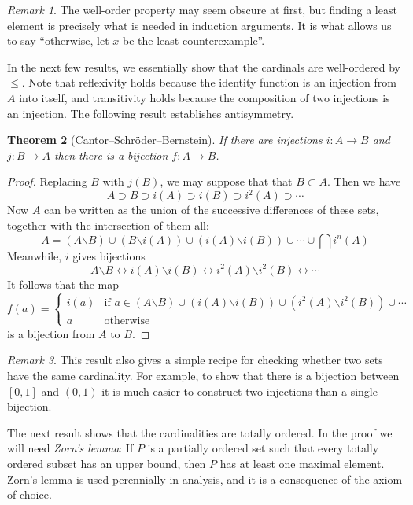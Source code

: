 \documentclass[11pt,oneside]{amsbook}
\theoremstyle{definition}
\theoremstyle{plain}
\newtheorem{thm}{Theorem}[section]
\theoremstyle{definition}
\theoremstyle{remark}
\newtheorem{rem}[thm]{Remark}
\begin{document}
\begin{rem}
  The well-order property may seem obscure at first, but finding a least element is precisely what is needed in induction arguments. It is what allows us to say ``otherwise, let $x$ be the least counterexample''.
\end{rem}

In the next few results, we essentially show that the cardinals are well-ordered by $\leq$. Note that reflexivity holds because the identity function is an injection from $A$ into itself, and transitivity holds because the composition of two injections is an injection. The following result establishes antisymmetry.

\begin{thm}[Cantor--Schr\"oder--Bernstein]
  \label{thm:csb}
  If there are injections $i\colon A\to B$ and $j\colon B\to A$ then there is a bijection $f\colon A\to B$.
\end{thm}

\begin{proof}
  Replacing $B$ with $j(B)$, we may suppose that that $B\subset A$. Then we have
  \[A\supset B\supset i(A)\supset i(B)\supset i^2(A)\supset\cdots
  \]
  Now $A$ can be written as the union of the successive differences of these sets, together with the intersection of them all:
  \[A=(A\mathord{\smallsetminus}B)\cup(B\mathord{\smallsetminus}i(A))
  \cup(i(A)\mathord{\smallsetminus}i(B))\cup\cdots\cup \bigcap i^n(A)
  \]
  Meanwhile, $i$ gives bijections
  \[A\mathord{\smallsetminus}B\leftrightarrow i(A)\mathord{\smallsetminus}i(B)\leftrightarrow i^2(A)\mathord{\smallsetminus}i^2(B)\leftrightarrow\cdots
  \]
  It follows that the map
  \[f(a)=\begin{cases}i(a)&\text{if }a\in(A\mathord{\smallsetminus}B)\cup(i(A)\mathord{\smallsetminus}i(B))\cup(i^2(A)\mathord{\smallsetminus}i^2(B))\cup\cdots\\
    a&\text{otherwise}
  \end{cases}
  \]
  is a bijection from $A$ to $B$.
\end{proof}

\begin{rem}
  This result also gives a simple recipe for checking whether two sets have the same cardinality. For example, to show that there is a bijection between $[0,1]$ and $(0,1)$ it is much easier to construct two injections than a single bijection.
\end{rem}

The next result shows that the cardinalities are totally ordered. In the proof we will need \emph{Zorn's lemma}: If $P$ is a partially ordered set such that every totally ordered subset has an upper bound, then $P$ has at least one maximal element.  Zorn's lemma is used perennially in analysis, and it is a consequence of the axiom of choice.
\end{document}
